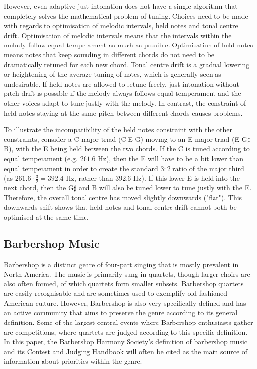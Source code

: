 \documentclass[a4paper]{article}
\begin{document}
However, even adaptive just intonation does not have a single algorithm that completely solves the mathematical problem of tuning. Choices need to be made with regards to optimisation of melodic intervals, held notes and tonal centre drift. Optimisation of melodic intervals means that the intervals within the melody follow equal temperament as much as possible. Optimisation of held notes means notes that keep sounding in different chords do not need to be dramatically retuned for each new chord. Tonal centre drift is a gradual lowering or heightening of the average tuning of notes, which is generally seen as undesirable.\cite{dougherty_choral_2004, barbershop_harmony_society_contest_2022} If held notes are allowed to retune freely, just intonation without pitch drift is possible if the melody always follows equal temperament and the other voices adapt to tune justly with the melody.\cite{dougherty_choral_2004} In contrast, the constraint of held notes staying at the same pitch between different chords causes problems.

To illustrate the incompatibility of the held notes constraint with the other constraints, consider a C major triad (C-E-G) moving to an E major triad (E-G$\sharp$-B), with the E being held between the two chords. If the C is tuned according to equal temperament (e.g. $261.6$ Hz), then the E will have to be a bit lower than equal temperament in order to create the standard $3:2$ ratio of the major third (as $261.6 \cdot \frac32 = 392.4$ Hz, rather than $392.6$ Hz). If this lower E is held into the next chord, then the G$\sharp$ and B will also be tuned lower to tune justly with the E. Therefore, the overall tonal centre has moved slightly downwards ("flat"). This downwards shift shows that held notes and tonal centre drift cannot both be optimised at the same time.

\subsection{Barbershop Music}
\label{intro_bs}
Barbershop is a distinct genre of four-part singing that is mostly prevalent in North America. The music is primarily sung in quartets, though larger choirs are also often formed, of which quartets form smaller subsets.\cite{garnett_ethics_1999} Barbershop quartets are easily recognisable and are sometimes used to exemplify old-fashioned American culture. However, Barbershop is also very specifically defined and has an active community that aims to preserve the genre according to its general definition. Some of the largest central events where Barbershop enthusiasts gather are competitions, where quartets are judged according to this specific definition.\cite{barbershop_harmony_society_contest_2022} In this paper, the Barbershop Harmony Society's definition of barbershop music and its Contest and Judging Handbook will often be cited as the main source of information about priorities within the genre.
\end{document}
